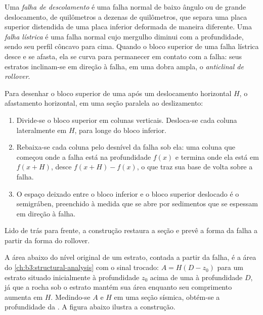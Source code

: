 \begin{definition}\label{def:b3:extension-strike-slip:detachment}
Uma \emph{falha de descolamento} é uma falha normal de baixo
ângulo ou  de grande deslocamento, de quilômetros a dezenas de quilômetros, que
separa uma placa superior distendida de uma placa inferior deformada de maneira diferente. Uma
\emph{falha lístrica} é uma falha normal cujo mergulho
diminui com a profundidade, sendo seu perfil côncavo para cima. Quando o bloco superior de
uma falha lístrica desce e se afasta, ela se curva para permanecer em contato com a
falha: seus estratos inclinam-se em direção à falha, em uma dobra ampla, o
\emph{anticlinal de rollover}.
\end{definition}

\begin{method}\label{met:b3:extension-strike-slip:heave}
Para desenhar o bloco superior de uma  após um deslocamento horizontal
$H$, o afastamento horizontal, em uma seção paralela ao deslizamento:
\begin{enumerate}
  \item Divide-se o bloco superior em colunas verticais. Desloca-se cada coluna
        lateralmente em $H$, para longe do bloco inferior.
  \item Rebaixa-se cada coluna pelo desnível da falha sob ela: uma coluna que
        começou onde a falha está na profundidade $f(x)$ e termina onde ela está
        em $f(x + H)$, desce $f(x + H) - f(x)$, o que traz sua base
        de volta sobre a falha.
  \item O espaço deixado entre o bloco inferior e o bloco superior deslocado é o
        semigráben, preenchido à medida que se abre por sedimentos que se espessam em direção à
        falha.
\end{enumerate}
Lido de trás para frente, a construção restaura a seção e prevê a forma
da falha a partir da forma do rollover.
\end{method}

A área abaixo do nível original de um estrato, contada a partir da falha, é
a área do \cref{ch:b3:structural-analysis} com o sinal trocado: $A =
H(D - z_0)$ para um estrato situado inicialmente à profundidade $z_0$ acima de uma  à
profundidade $D$, já que a rocha sob o estrato mantém sua área enquanto seu comprimento aumenta
em $H$. Medindo-se $A$ e $H$ em uma seção sísmica, obtém-se a profundidade da
. A figura abaixo ilustra a construção.

